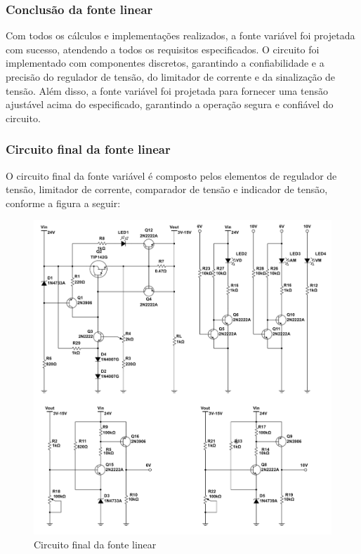 \subsubsection*{Conclusão da fonte linear}

Com todos os cálculos e implementações realizados, a fonte variável foi projetada com sucesso, atendendo a todos os requisitos especificados. O circuito foi implementado com componentes discretos, garantindo a confiabilidade e a precisão do regulador de tensão, do limitador de corrente e da sinalização de tensão. Além disso, a fonte variável foi projetada para fornecer uma tensão ajustável acima do especificado, garantindo a operação segura e confiável do circuito.

\subsubsection*{Circuito final da fonte linear}

O circuito final da fonte variável é composto pelos elementos de regulador de tensão, limitador de corrente, comparador de tensão e indicador de tensão, conforme a figura a seguir:

\begin{figure}[H]
    \centering
    \includegraphics[width=1\textwidth]{../imagens/circuito_final.png}
    \caption{Circuito final da fonte linear}
    \label{fig:final}
\end{figure}

